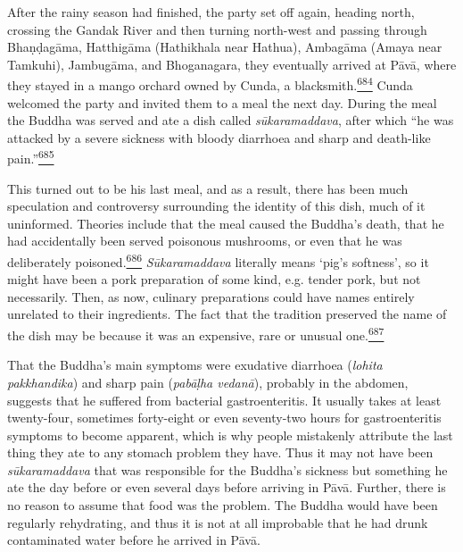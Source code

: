 After the rainy season had finished, the party set off again, heading
north, crossing the Gandak River and then turning north-west and passing
through Bhaṇḍagāma, Hatthigāma (Hathikhala near Hathua), Ambagāma (Amaya
near Tamkuhi), Jambugāma, and Bhoganagara, they eventually arrived at
Pāvā, where they stayed in a mango orchard owned by Cunda, a
blacksmith.\label{footprints_split_017.html_fnref684}\hyperref[footprints_split_025.htmlux5cux23fn684]{\textsuperscript{684}}
Cunda welcomed the party and invited them to a meal the next day. During
the meal the Buddha was served and ate a dish called
\emph{sūkaramaddava}, after which ``he was attacked by a severe sickness
with bloody diarrhoea and sharp and death-like
pain.''\label{footprints_split_017.html_fnref685}\hyperref[footprints_split_025.htmlux5cux23fn685]{\textsuperscript{685}}

This turned out to be his last meal, and as a result, there has been
much speculation and controversy surrounding the identity of this dish,
much of it uninformed. Theories include that the meal caused the
Buddha's death, that he had accidentally been served poisonous
mushrooms, or even that he was deliberately
poisoned.\label{footprints_split_017.html_fnref686}\hyperref[footprints_split_025.htmlux5cux23fn686]{\textsuperscript{686}}
\emph{Sūkaramaddava} literally means `pig's softness', so it might have
been a pork preparation of some kind, e.g. tender pork, but not
necessarily. Then, as now, culinary preparations could have names
entirely unrelated to their ingredients. The fact that the tradition
preserved the name of the dish may be because it was an expensive, rare
or unusual
one.\label{footprints_split_017.html_fnref687}\hyperref[footprints_split_025.htmlux5cux23fn687]{\textsuperscript{687}}

That the Buddha's main symptoms were exudative diarrhoea (\emph{lohita
pakkhandika}) and sharp pain (\emph{pabāḷha vedanā}), probably in the
abdomen, suggests that he suffered from bacterial gastroenteritis. It
usually takes at least twenty-four, sometimes forty-eight or even
seventy-two hours for gastroenteritis symptoms to become apparent, which
is why people mistakenly attribute the last thing they ate to any
stomach problem they have. Thus it may not have been
\emph{sūkaramaddava} that was responsible for the Buddha's sickness but
something he ate the day before or even several days before arriving in
Pāvā. Further, there is no reason to assume that food was the problem.
The Buddha would have been regularly rehydrating, and thus it is not at
all improbable that he had drunk contaminated water before he arrived in
Pāvā.


